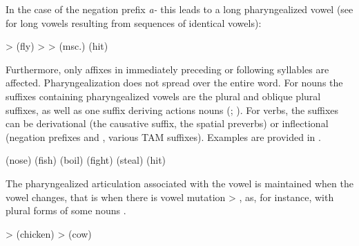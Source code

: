 In the case of the negation prefix \textit{a-} this leads to a long pharyngealized vowel (see  for long vowels resulting from sequences of identical vowels):

\begin{exe}
	\ex	\label{ex:pharyngealization long vowel}
\begin{xlist}
\ex	{} >   (fly)
\ex	{} >  >   (msc.) (hit)
	\end{xlist}
\end{exe}	


Furthermore, only affixes in immediately preceding or following syllables are affected. Pharyngealization does not spread over the entire word. For nouns the suffixes containing pharyngealized vowels are the plural and oblique plural suffixes, as well as one suffix deriving actions nouns (; ). For verbs, the suffixes can be derivational (the causative suffix, the spatial preverbs) or inflectional (negation prefixes  and , various TAM suffixes). Examples are provided in .
%
\begin{exe}
	\ex	\label{ex:pharyngealization spread phon}
\begin{xlist}
		\ex {}  (nose)	
		\ex {}  (fish)
		\ex {}  (boil)	
		\ex {}  (fight) 
		\ex {}  (steal)	
		\ex	{}  (hit)
\end{xlist}
\end{exe}

The pharyngealized articulation associated with the vowel is maintained when the vowel changes, that is when there is vowel mutation  > , as, for instance, with plural forms of some nouns .
%
\begin{exe}
	\ex	\label{ex:vowel mutation plural phon}
	\begin{xlist}
		\ex	{}  >   (chicken)
		\ex	{}  >   (cow)
	\end{xlist}
\end{exe}


